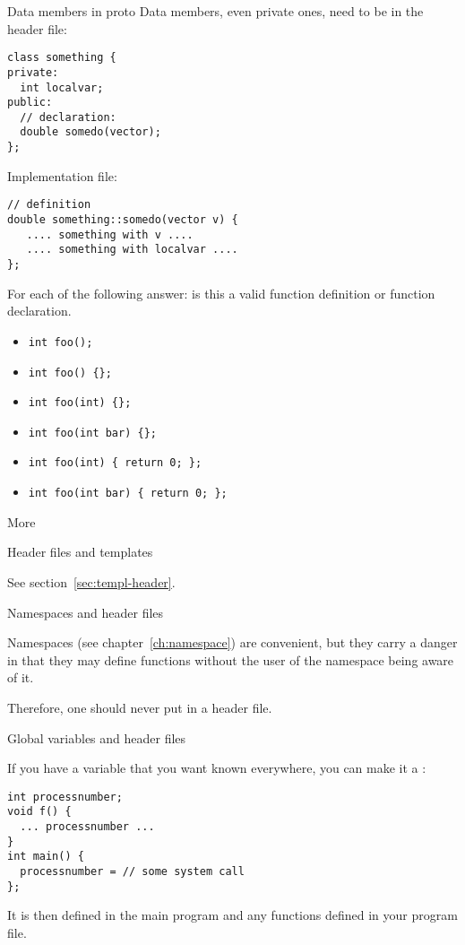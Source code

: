 \begin{block}{Data members in proto}
  \label{sl:class-proto-private}
  Data members, even private ones, need to be in the header file:
  \lstset{style=snippetcode}
\begin{lstlisting}
class something {
private:
  int localvar;
public:
  // declaration:
  double somedo(vector);
};
\end{lstlisting}
Implementation file:
\begin{lstlisting}
// definition
double something::somedo(vector v) {
   .... something with v ....
   .... something with localvar ....
};
\end{lstlisting}
\end{block}

\begin{review}
  \label{rev:proto-c-cpp}
  For each of the following answer: is this a valid function
  definition or function declaration.
  \begin{itemize}
  \item \lstinline+int foo();+
  \item \lstinline+int foo() {};+
  \item \lstinline+int foo(int) {};+
  \item \lstinline+int foo(int bar) {};+
  \item \lstinline+int foo(int) { return 0; };+
  \item \lstinline+int foo(int bar) { return 0; };+
  \end{itemize}
\end{review}

 {More}

 {Header files and templates}

See section~\ref{sec:templ-header}.

 {Namespaces and header files}
\label{sec:namespace-header}

Namespaces
(see chapter~\ref{ch:namespace})
are convenient, but they carry a danger in that they may define
functions without the user of the namespace being aware of it.

Therefore, one should never put  in a header
file.

 {Global variables and header files}
\label{ex:globalvar}

If you have a variable that you want known everywhere, you can make it
a :
\begin{lstlisting}
int processnumber;
void f() {
  ... processnumber ...
}
int main() {
  processnumber = // some system call
};
\end{lstlisting}
It is then defined in the main program and any functions defined in your program file.

